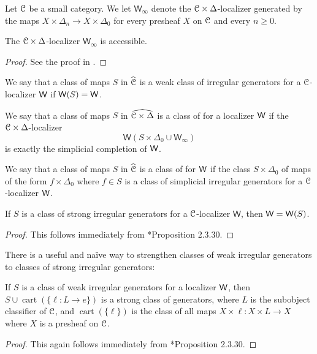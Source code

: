 Let \(\mathcal{C}\) be a small category.  We let \(\mathsf{W}_\infty\) denote the \(\mathcal{C}\times \Delta\)-localizer generated by the maps \(X\times \Delta_n\to X\times \Delta_0\) for every presheaf \(X\) on \(\mathcal{C}\) and every \(n\geq 0\).  
\begin{prop} The \(\mathcal{C}\times \Delta\)-localizer \(\mathsf{W}_\infty\) is accessible.
\end{prop}   
\begin{proof}See the proof in \cite{cisinski-book}.
\end{proof}
\begin{defn}
We say that a class of maps \(S\) in \(\widehat{\mathcal{C}}\) is a weak class of irregular generators for a \(\mathcal{C}\)-localizer \(\mathsf{W}\) if \(\mathsf{W}(S)=\mathsf{W}\).

We say that a class of maps \(S\) in \(\widehat{\mathcal{C}\times \Delta}\) is a class of  for a localizer \(\mathsf{W}\) if the \(\mathcal{C}\times \Delta\)-localizer \[\mathsf{W}(S\times \Delta_0 \cup \mathsf{W}_\infty)\] is exactly the simplicial completion of \(\mathsf{W}\).  

We say that a class of maps \(S\)  in \(\widehat{\mathcal{C}}\) is a class of  for \(\mathsf{W}\)  if the class \(S\times \Delta_0\) of maps of the form \(f\times \Delta_0\) where \(f\in S\) is a class of simplicial irregular generators for a \(\mathcal{C}\)-localizer \(\mathsf{W}\).
\end{defn}
\begin{prop}If \(S\) is a class of strong irregular generators for a \(\mathcal{C}\)-localizer \(\mathsf{W}\), then \(\mathsf{W}=\mathsf{W}(S)\).
\end{prop}
\begin{proof}This follows immediately from \cite{cisinski-book}*{Proposition 2.3.30}.  
\end{proof}
There is a useful and na\"ive way to strengthen classes of weak irregular generators to classes of strong irregular generators:
\begin{prop} If \(S\) is a class of weak irregular generators for a localizer \(\mathsf{W}\), then \(S\cup \operatorname{cart}(\{\ell:L\to e\})\) is a strong class of generators, where \(L\) is the subobject classifier of \(\mathcal{C}\), and \(\operatorname{cart}(\{\ell\})\) is the class of all maps \(X\times \ell:X\times L \to X\) where \(X\) is a presheaf on \(\mathcal{C}\).  
\end{prop}
\begin{proof}This again follows immediately from \cite{cisinski-book}*{Proposition 2.3.30}.
\end{proof}
